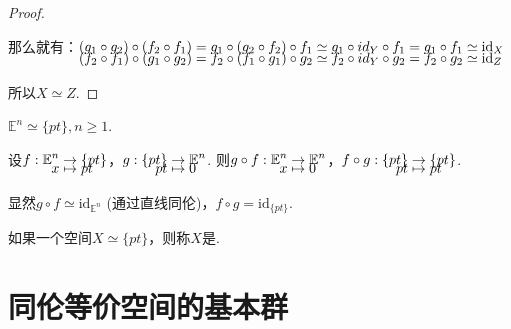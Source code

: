 \begin{proof}
\begin{center}
    \end{center}\par
    \vspace{-1 em}
    那么就有：$\setjot[-4]\begin{aligned}[t]
        &(g_1 \circ g_2) \circ (f_2 \circ f_1)= g_1 \circ (g_2 \circ f_2) \circ f_1 \simeq g_1 \circ id_Y \circ f_1 = g_1 \circ f_1 \simeq \mathrm{id}_X \\
        &(f_2 \circ f_1) \circ (g_1 \circ g_2)= f_2 \circ (f_1 \circ g_1) \circ g_2 \simeq f_2 \circ id_Y \circ g_2 = f_2 \circ g_2 \simeq \mathrm{id}_Z
    \end{aligned}$\par
    所以$X \simeq Z$.
\end{proof}

\begin{instance}
    $\mathbb{E}^n \simeq \{pt\}, n \geq 1$.\par
    设$\setjot[-6]\begin{aligned}[t]
        f: \mathbb{E}^n &\to \{pt\} \\
        x &\mapsto pt
    \end{aligned} $，$\setjot[-6]\begin{aligned}[t]
        g: \{pt\} &\to \mathbb{E}^n\\
        pt &\mapsto 0
    \end{aligned}$.
    则$\setjot[-6]\begin{aligned}[t]
         g \circ f: \mathbb{E}^n &\to \mathbb{E}^n\\
         x &\mapsto 0
    \end{aligned}$，$\setjot[-6]\begin{aligned}[t]
            f \circ g: \{pt\} &\to \{pt\} \\
            pt &\mapsto pt
    \end{aligned}$.\par
    显然$g \circ f \simeq \mathrm{id}_{\mathbb{E}^n}$ (通过直线同伦)，$f \circ g = \mathrm{id}_{\{pt\}}$.
\end{instance}

\begin{definition}[可缩][def:10.17]
    如果一个空间$X \simeq \{pt\}$，则称$X$是.
\end{definition}

\section{同伦等价空间的基本群}

